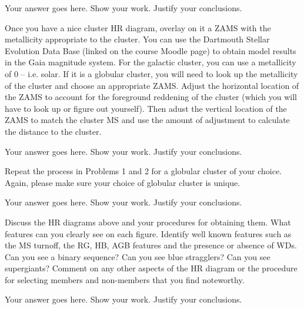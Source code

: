 \documentclass[12pt]{article}
\newenvironment{problem}[2][Problem]{\begin{trivlist}
\item[\hskip \labelsep {\bfseries #1}\hskip \labelsep {\bfseries #2.}]}{\end{trivlist}}
\newenvironment{answer}[2][Answer]{\begin{trivlist}
\item[\hskip \labelsep {\bfseries #1}\hskip \labelsep {\bfseries #2.}]}{\end{trivlist}}
\begin{document}
\begin{answer}{1}
Your answer goes here. Show your work. Justify your conclusions.
\end{answer}

\begin{problem}{2} Once you have a nice cluster HR diagram, overlay on it a ZAMS with the metallicity appropriate to the cluster. You can use the Dartmouth Stellar Evolution Data Base (linked on the course Moodle page) to obtain model results in the Gaia magnitude system. For the galactic cluster, you can use a metallicity of 0 -- i.e. solar. If it is a globular cluster, you will need to look up the metallicity of the cluster and choose an appropriate ZAMS. Adjust the horizontal location of the ZAMS to account for the foreground reddening of the cluster (which you will have to look up or figure out yourself). Then adust the vertical location of the ZAMS to match the cluster MS and use the amount of adjustment to calculate the distance to the cluster. 

\end{problem}

\begin{answer}{2}
Your answer goes here. Show your work. Justify your conclusions.
\end{answer}
 
\begin{problem}{3} Repeat the process in Problems 1 and 2 for a globular cluster of your choice. Again, please make sure your choice of globular cluster is unique.

\end{problem}

 \begin{answer}{3} 
Your answer goes here. Show your work. Justify your conclusions.
\end{answer}
 
\begin{problem}{4} Discuss the HR diagrams above and your procedures for obtaining them. What features can you clearly see on each figure. Identify well known features such as the MS turnoff, the RG, HB, AGB features and the presence or absence of WDs. Can you see a binary sequence? Can you see blue stragglers? Can you see supergiants? Comment on any other aspects of the HR diagram or the procedure for selecting members and non-members that you find noteworthy.

\end{problem}

\begin{answer}{4}
Your answer goes here. Show your work. Justify your conclusions.
\end{answer}
 
\end{document}
